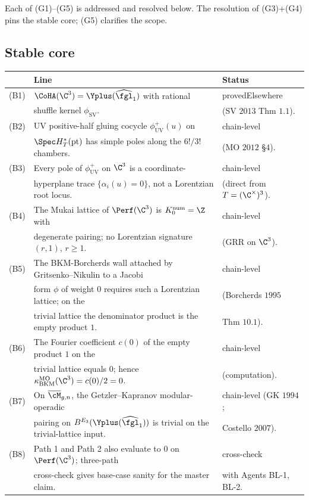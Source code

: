 Each of (G1)--(G5) is addressed and resolved below. The resolution
of (G3)+(G4) pins the stable core; (G5) clarifies the scope.

\subsection*{Stable core}

\begin{center}
\renewcommand{\arraystretch}{1.3}
\begin{tabular}{rll}
 \toprule
 & \textbf{Line} & \textbf{Status} \\
 \midrule
 (B1) & $\CoHA(\C^3) = \Yplus(\widehat{\fgl}_1)$ with rational &
 provedElsewhere \\
 & shuffle kernel $\phi_{\mathrm{SV}}$. & (SV $2013$ Thm $1.1$). \\
 (B2) & UV positive-half gluing cocycle $\phi^+_{\mathrm{UV}}(u)$
 on & chain-level \\
 & $\Spec H^*_T(\mathrm{pt})$ has simple poles along the $6!/$$3!$
 chambers. & (MO $2012$ \S $4$). \\
 (B3) & Every pole of $\phi^+_{\mathrm{UV}}$ on $\C^3$ is a
 coordinate- & chain-level \\
 & hyperplane trace $\{\alpha_i(u) = 0\}$, not a Lorentzian root
 locus. & (direct from $T = (\C^\times)^3$). \\
 (B4) & The Mukai lattice of $\Perf(\C^3)$ is $K_0^{\mathrm{num}} =
 \Z$ with & chain-level \\
 & degenerate pairing; no Lorentzian signature $(r, 1)$, $r \geq 1$. &
 (GRR on $\C^3$). \\
 (B5) & The BKM-Borcherds wall attached by Gritsenko--Nikulin to a
 Jacobi & chain-level \\
 & form $\phi$ of weight $0$ requires such a Lorentzian lattice; on the
 & (Borcherds $1995$ \\
 & trivial lattice the denominator product is the empty product $1$. &
 Thm $10.1$). \\
 (B6) & The Fourier coefficient $c(0)$ of the empty product $1$ on the
 & chain-level \\
 & trivial lattice equals $0$; hence $\kappa_{\mathrm{BKM}}^{\mathrm{MO}}
 (\C^3) = c(0)/2 = 0$. & (computation). \\
 (B7) & On $\overline{\cM}_{g, n}$, the Getzler--Kapranov modular-
 operadic & chain-level (GK $1994$; \\
 & pairing on $B^{E_3}(\Yplus(\widehat{\fgl}_1))$ is trivial on the
 trivial-lattice input. & Costello $2007$). \\
 (B8) & Path 1 and Path 2 also evaluate to $0$ on $\Perf(\C^3)$;
 three-path & cross-check \\
 & cross-check gives base-case sanity for the master claim. & with
 Agents BL-1, BL-2. \\
 \bottomrule
\end{tabular}
\end{center}

